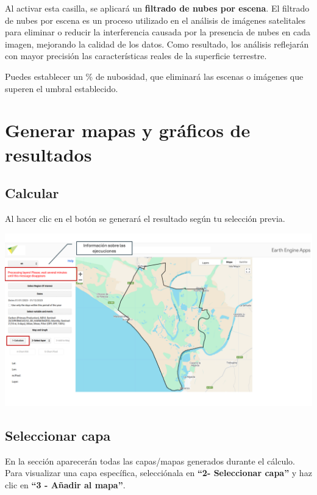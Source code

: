 \documentclass[
]{book}
\begin{document}
Al activar esta casilla, se aplicará un \textbf{filtrado de nubes por escena}. El filtrado de nubes por escena es un proceso utilizado en el análisis de imágenes satelitales para eliminar o reducir la interferencia causada por la presencia de nubes en cada imagen, mejorando la calidad de los datos. Como resultado, los análisis reflejarán con mayor precisión las características reales de la superficie terrestre.

Puedes establecer un \% de nubosidad, que eliminará las escenas o imágenes que superen el umbral establecido.

\chapter{Generar mapas y gráficos de resultados}\label{mapas-graficos}

\section{\texorpdfstring{\textbf{Calcular}}{Calcular}}\label{calcular}

Al hacer clic en el botón se generará el resultado según tu selección previa.

\includegraphics{assets/message_es.png}

\section{\texorpdfstring{\textbf{Seleccionar capa}}{Seleccionar capa}}\label{seleccionar-capa}

En la sección aparecerán todas las capas/mapas generados durante el cálculo. Para visualizar una capa específica, selecciónala en \textbf{``2- Seleccionar capa''} y haz clic en \textbf{``3 - Añadir al mapa''}.
\end{document}
